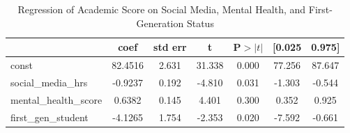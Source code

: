 \begin{table}[H]
\centering
\footnotesize
\caption{Regression of Academic Score on Social Media, Mental Health, and First-Generation Status}
\begin{tabular}{lcccccc}
\hline\hline
 & coef & std err & t & P$>|t|$ & [0.025 & 0.975] \\
\hline
const              & 82.4516  & 2.631  & 31.338 & 0.000 & 77.256 & 87.647 \\
social\_media\_hrs & -0.9237  & 0.192  & -4.810 & 0.031 & -1.303 & -0.544 \\
mental\_health\_score & 0.6382 & 0.145  & 4.401  & 0.300 & 0.352  & 0.925 \\
first\_gen\_student & -4.1265 & 1.754  & -2.353 & 0.020 & -7.592 & -0.661 \\
\hline\hline
\end{tabular}
\end{table}
